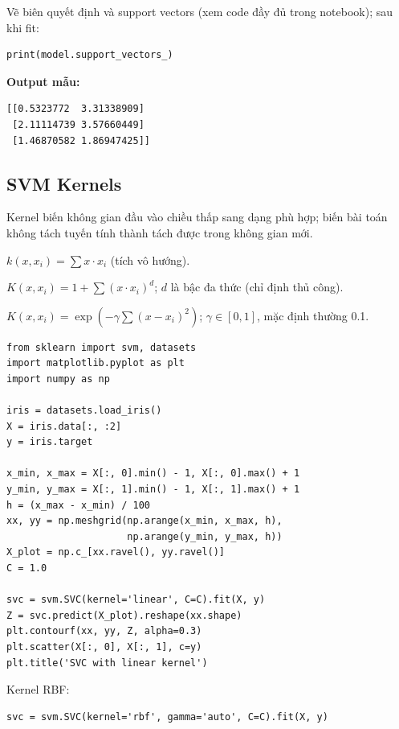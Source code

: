 \begin{vidu}[title={Hàm decision\_function và support vectors}]
Vẽ biên quyết định và support vectors (xem code đầy đủ trong notebook); sau khi fit:

\begin{lstlisting}
print(model.support_vectors_)
\end{lstlisting}

\textbf{Output mẫu:}
\begin{verbatim}
[[0.5323772  3.31338909]
 [2.11114739 3.57660449]
 [1.46870582 1.86947425]]
\end{verbatim}
\end{vidu}

\subsection{SVM Kernels}

\begin{phuongphap}[title={Kernel trick}]
Kernel biến không gian đầu vào chiều thấp sang dạng phù hợp; biến bài toán không tách tuyến tính thành tách được trong không gian mới.
\end{phuongphap}

\begin{tinhchat}[title={Linear kernel}]
$k(x, x_i) = \sum x \cdot x_i$ (tích vô hướng).
\end{tinhchat}

\begin{tinhchat}[title={Polynomial kernel}]
$K(x, x_i) = 1 + \sum(x \cdot x_i)^d$; $d$ là bậc đa thức (chỉ định thủ công).
\end{tinhchat}

\begin{tinhchat}[title={RBF kernel}]
$K(x, x_i) = \exp(-\gamma \sum (x - x_i)^2)$; $\gamma \in [0,1]$, mặc định thường 0.1.
\end{tinhchat}

\begin{vidu}[title={SVM với kernel trên Iris (2 feature)}]
\begin{lstlisting}
from sklearn import svm, datasets
import matplotlib.pyplot as plt
import numpy as np

iris = datasets.load_iris()
X = iris.data[:, :2]
y = iris.target

x_min, x_max = X[:, 0].min() - 1, X[:, 0].max() + 1
y_min, y_max = X[:, 1].min() - 1, X[:, 1].max() + 1
h = (x_max - x_min) / 100
xx, yy = np.meshgrid(np.arange(x_min, x_max, h),
                     np.arange(y_min, y_max, h))
X_plot = np.c_[xx.ravel(), yy.ravel()]
C = 1.0

svc = svm.SVC(kernel='linear', C=C).fit(X, y)
Z = svc.predict(X_plot).reshape(xx.shape)
plt.contourf(xx, yy, Z, alpha=0.3)
plt.scatter(X[:, 0], X[:, 1], c=y)
plt.title('SVC with linear kernel')
\end{lstlisting}

Kernel RBF:
\begin{lstlisting}
svc = svm.SVC(kernel='rbf', gamma='auto', C=C).fit(X, y)
\end{lstlisting}
\end{vidu}

